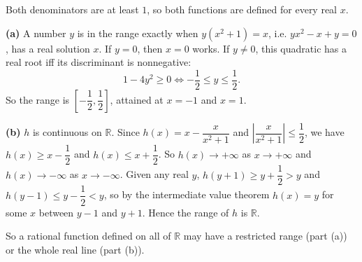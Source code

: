 Both denominators are at least \(1\), so both functions are defined for every real \(x\).

\textbf{(a)} A number \(y\) is in the range exactly when \(y(x^2+1)=x\), i.e. \(yx^2-x+y=0\), has a real solution \(x\). If \(y=0\), then \(x=0\) works. If \(y\ne0\), this quadratic has a real root iff its discriminant is nonnegative:
\[
1-4y^2\ge 0\iff -\dfrac{1}{2}\le y\le \dfrac{1}{2} .
\]
So the range is \(\boxed{\left[-\dfrac{1}{2},\dfrac{1}{2}\right]}\), attained at \(x=-1\) and \(x=1\).

\textbf{(b)} \(h\) is continuous on \(\mathbb{R}\). Since \(h(x)=x-\dfrac{x}{x^2+1}\) and \(\left|\dfrac{x}{x^2+1}\right|\le\dfrac{1}{2}\), we have \(h(x)\ge x-\dfrac{1}{2}\) and \(h(x)\le x+\dfrac{1}{2}\). So \(h(x)\to+\infty\) as \(x\to+\infty\) and \(h(x)\to-\infty\) as \(x\to-\infty\). Given any real \(y\), \(h(y+1)\ge y+\dfrac{1}{2}>y\) and \(h(y-1)\le y-\dfrac{1}{2}<y\), so by the intermediate value theorem \(h(x)=y\) for some \(x\) between \(y-1\) and \(y+1\). Hence the range of \(h\) is \(\boxed{\mathbb{R}}\).

So a rational function defined on all of \(\mathbb{R}\) may have a restricted range (part (a)) or the whole real line (part (b)).
